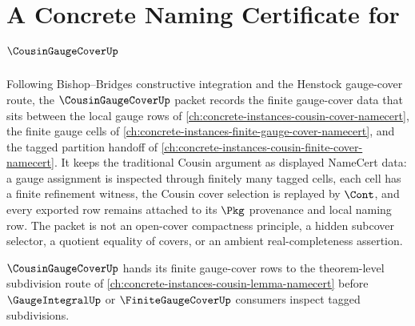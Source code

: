 \chapter{A Concrete Naming Certificate for $\CousinGaugeCoverUp$}
\label{ch:concrete-instances-cousin-gauge-cover-namecert}

Following Bishop--Bridges constructive integration and the Henstock gauge-cover route, the $\CousinGaugeCoverUp$ packet records the finite gauge-cover data that sits between the local gauge rows of \autoref{ch:concrete-instances-cousin-cover-namecert}, the finite gauge cells of \autoref{ch:concrete-instances-finite-gauge-cover-namecert}, and the tagged partition handoff of \autoref{ch:concrete-instances-cousin-finite-cover-namecert}. It keeps the traditional Cousin argument as displayed NameCert data: a gauge assignment is inspected through finitely many tagged cells, each cell has a finite refinement witness, the Cousin cover selection is replayed by $\Cont$, and every exported row remains attached to its $\Pkg$ provenance and local naming row. The packet is not an open-cover compactness principle, a hidden subcover selector, a quotient equality of covers, or an ambient real-completeness assertion.

$\CousinGaugeCoverUp$ hands its finite gauge-cover rows to the theorem-level subdivision route of \autoref{ch:concrete-instances-cousin-lemma-namecert} before $\GaugeIntegralUp$ or $\FiniteGaugeCoverUp$ consumers inspect tagged subdivisions.

